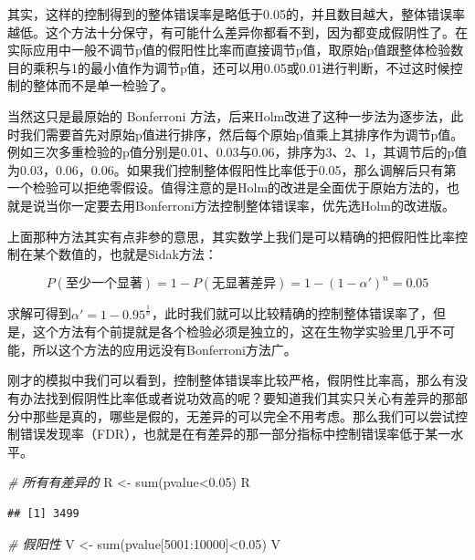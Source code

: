\documentclass[]{tufte-book}
\newenvironment{Shaded}{}{}
\newcommand{\CommentTok}[1]{\textcolor[rgb]{0.38,0.63,0.69}{\textit{#1}}}
\newcommand{\DecValTok}[1]{\textcolor[rgb]{0.25,0.63,0.44}{#1}}
\newcommand{\FloatTok}[1]{\textcolor[rgb]{0.25,0.63,0.44}{#1}}
\newcommand{\FunctionTok}[1]{\textcolor[rgb]{0.02,0.16,0.49}{#1}}
\newcommand{\NormalTok}[1]{#1}
\newcommand{\OtherTok}[1]{\textcolor[rgb]{0.00,0.44,0.13}{#1}}
\newcommand{\SpecialCharTok}[1]{\textcolor[rgb]{0.25,0.44,0.63}{#1}}
\begin{document}
其实，这样的控制得到的整体错误率是略低于0.05的，并且数目越大，整体错误率越低。这个方法十分保守，有可能什么差异你都看不到，因为都变成假阴性了。在实际应用中一般不调节p值的假阳性比率而直接调节p值，取原始p值跟整体检验数目的乘积与1的最小值作为调节p值，还可以用0.05或0.01进行判断，不过这时候控制的整体而不是单一检验了。

当然这只是最原始的 Bonferroni 方法，后来Holm改进了这种一步法为逐步法，此时我们需要首先对原始p值进行排序，然后每个原始p值乘上其排序作为调节p值。例如三次多重检验的p值分别是0.01、0.03与0.06，排序为3、2、1，其调节后的p值为0.03，0.06，0.06。如果我们控制整体假阳性比率低于0.05，那么调解后只有第一个检验可以拒绝零假设。值得注意的是Holm的改进是全面优于原始方法的，也就是说当你一定要去用Bonferroni方法控制整体错误率，优先选Holm的改进版。

上面那种方法其实有点非参的意思，其实数学上我们是可以精确的把假阳性比率控制在某个数值的，也就是Sidak方法：

\[
P(至少一个显著)=1-P(无显著差异) = 1-(1-\alpha')^n = 0.05
\]

求解可得到\(\alpha' = 1-0.95^{\frac{1}{n}}\)，此时我们就可以比较精确的控制整体错误率了，但是，这个方法有个前提就是各个检验必须是独立的，这在生物学实验里几乎不可能，所以这个方法的应用远没有Bonferroni方法广。

刚才的模拟中我们可以看到，控制整体错误率比较严格，假阴性比率高，那么有没有办法找到假阴性比率低或者说功效高的呢？要知道我们其实只关心有差异的那部分中那些是真的，哪些是假的，无差异的可以完全不用考虑。那么我们可以尝试控制错误发现率（FDR），也就是在有差异的那一部分指标中控制错误率低于某一水平。

\begin{Shaded}
\begin{Highlighting}[]
\CommentTok{\# 所有有差异的}
\NormalTok{R }\OtherTok{\textless{}{-}} \FunctionTok{sum}\NormalTok{(pvalue}\SpecialCharTok{\textless{}}\FloatTok{0.05}\NormalTok{)}
\NormalTok{R}
\end{Highlighting}
\end{Shaded}

\begin{verbatim}
## [1] 3499
\end{verbatim}

\begin{Shaded}
\begin{Highlighting}[]
\CommentTok{\# 假阳性}
\NormalTok{V }\OtherTok{\textless{}{-}} \FunctionTok{sum}\NormalTok{(pvalue[}\DecValTok{5001}\SpecialCharTok{:}\DecValTok{10000}\NormalTok{]}\SpecialCharTok{\textless{}}\FloatTok{0.05}\NormalTok{)}
\NormalTok{V}
\end{Highlighting}
\end{Shaded}
\end{document}
